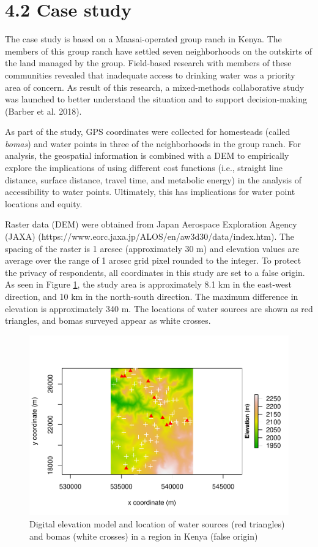 \documentclass[]{elsarticle} %
\makeatletter
\def\maxwidth{\ifdim\Gin@nat@width>\linewidth\linewidth
\else\Gin@nat@width\fi}
\let\Oldincludegraphics\includegraphics
\renewcommand{\includegraphics}[1]{\Oldincludegraphics[width=\maxwidth]{#1}}
\makeatother
\begin{document}
\hypertarget{case-study}{%
\section{4.2 Case study}\label{case-study}}

The case study is based on a Maasai-operated group ranch in Kenya. The
members of this group ranch have settled seven neighborhoods on the
outskirts of the land managed by the group. Field-based research with
members of these communities revealed that inadequate access to drinking
water was a priority area of concern. As result of this research, a
mixed-methods collaborative study was launched to better understand the
situation and to support decision-making (Barber et al. 2018).

As part of the study, GPS coordinates were collected for homesteads
(called \emph{bomas}) and water points in three of the neighborhoods in
the group ranch. For analysis, the geospatial information is combined
with a DEM to empirically explore the implications of using different
cost functions (i.e., straight line distance, surface distance, travel
time, and metabolic energy) in the analysis of accessibility to water
points. Ultimately, this has implications for water point locations and
equity.

Raster data (DEM) were obtained from Japan Aerospace Exploration Agency
(JAXA) (https://www.eorc.jaxa.jp/ALOS/en/aw3d30/data/index.htm). The
spacing of the raster is 1 arcsec (approximately 30 m) and elevation
values are average over the range of 1 arcsec grid pixel rounded to the
integer. To protect the privacy of respondents, all coordinates in this
study are set to a false origin. As seen in Figure
\ref{fig:figure-study-area}, the study area is approximately 8.1 km in
the east-west direction, and 10 km in the north-south direction. The
maximum difference in elevation is approximately 340 m. The locations of
water sources are shown as red triangles, and bomas surveyed appear as
white crosses.

\begin{figure}
\centering
\includegraphics{Cost-Functions-for-Walking-Accessibility_files/figure-latex/figure-study-area-1.pdf}
\caption{\label{fig:figure-study-area}Digital elevation model and
location of water sources (red triangles) and bomas (white crosses) in a
region in Kenya (false origin)}
\end{figure}
\end{document}
